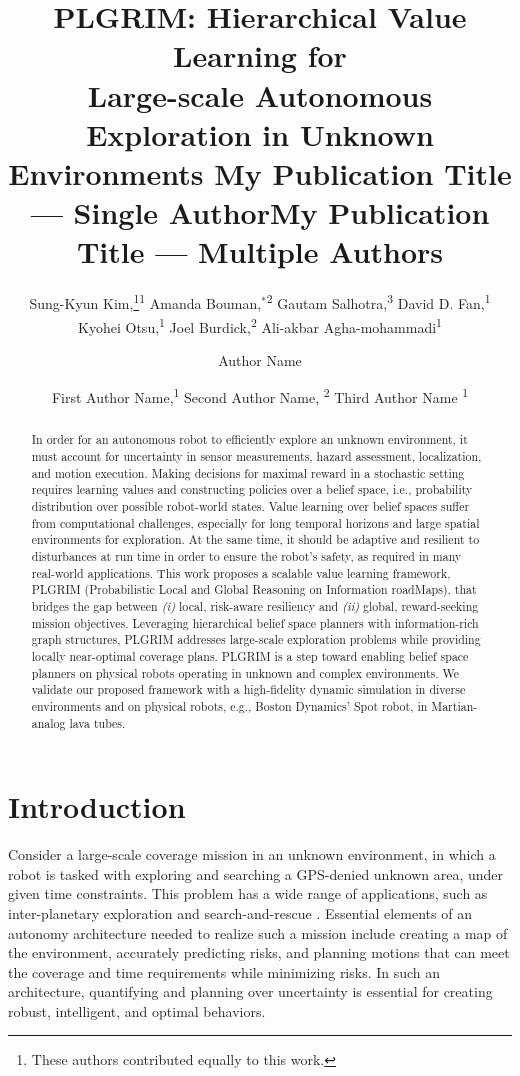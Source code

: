 \documentclass[letterpaper]{article} %
\title{
    PLGRIM: Hierarchical Value Learning for \\Large-scale Autonomous Exploration in Unknown Environments
}
\author{
		Sung-Kyun Kim,\thanks{These authors contributed equally to this work.}\textsuperscript{\rm 1}
    Amanda Bouman,$^{*}$\textsuperscript{\rm 2}
    Gautam Salhotra,\textsuperscript{\rm 3}
    David D. Fan,\textsuperscript{\rm 1} \\
    Kyohei Otsu,\textsuperscript{\rm 1}
    Joel Burdick,\textsuperscript{\rm 2}
    Ali-akbar Agha-mohammadi\textsuperscript{\rm 1} \\
}
\title{My Publication Title --- Single Author}
\author {
    Author Name \\
}
\title{My Publication Title --- Multiple Authors}
\author {
    First Author Name,\textsuperscript{\rm 1}
    Second Author Name, \textsuperscript{\rm 2}
    Third Author Name \textsuperscript{\rm 1} \\
}
\newcommand{\phdone}[1]{} %
\newcommand{\acomm}[1]{{\color{cyan}Ali:#1}} %
\begin{document}
\maketitle

\begin{abstract}
In order for an autonomous robot to efficiently explore an unknown environment, it must account for uncertainty in sensor measurements, hazard assessment, localization, and motion execution.
Making decisions for maximal reward in a stochastic setting requires learning values and constructing policies over a belief space, i.e., probability distribution over possible robot-world states.
Value learning over belief spaces suffer from computational challenges, especially for long temporal horizons and large spatial environments for exploration. %
At the same time, it should be adaptive and resilient to disturbances at run time in order to ensure the robot's safety, as required in many real-world applications.
This work proposes a scalable value learning framework, PLGRIM (Probabilistic Local and Global Reasoning on Information roadMaps), that bridges the gap between \textit{(i)} local, risk-aware resiliency and \textit{(ii)} global, reward-seeking mission objectives.  
Leveraging hierarchical belief space planners with information-rich graph structures, PLGRIM addresses large-scale exploration problems while providing locally near-optimal coverage plans. 
PLGRIM is a step toward enabling belief space planners on physical robots operating in unknown and complex environments. 
We validate our proposed framework with a high-fidelity dynamic simulation in diverse environments and on physical robots, e.g., Boston Dynamics' Spot robot, in Martian-analog lava tubes.
\end{abstract}


\section{Introduction}\label{sec:intro}

\phdone{High-level mission}
Consider a large-scale coverage mission in an unknown environment, in which a robot is tasked with exploring and searching a GPS-denied unknown area, under given time constraints. This problem has a wide range of applications, such as inter-planetary exploration and search-and-rescue \cite{blank2020robotic,nagatani2013emergency}. %
Essential elements of an autonomy architecture needed to realize such a mission include creating a map of the environment, accurately predicting risks, and planning motions that can meet the coverage and time requirements while minimizing risks.  In such an architecture, quantifying and planning over uncertainty is essential for creating robust, intelligent, and optimal behaviors.
\end{document}
